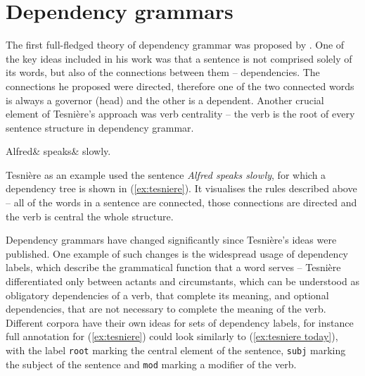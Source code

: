 \section{Dependency grammars}
The first full-fledged theory of dependency grammar was proposed by \cite{tesniere-orig, tesniere}. One of the key ideas included in his work was that a sentence is not comprised solely of its words, but also of the connections between them -- dependencies. The connections he proposed were directed, therefore one of the two connected words is always a governor (head) and the other is a dependent. Another crucial element of Tesnière's approach was verb centrality -- the verb is the root of every sentence structure in dependency grammar. 

\begin{center}
\begin{exe}
	\ex
	\label{ex:tesniere}
    \begin{dependency}[theme = simple, baseline=-\the\dimexpr\fontdimen22\textfont2\relax]
    \begin{deptext}
        Alfred\& speaks\& slowly.\\
    \end{deptext}
    \end{dependency}
\end{exe}
\end{center}

Tesnière as an example used the sentence \textsl{Alfred speaks slowly}, for which a dependency tree is shown in (\ref{ex:tesniere}). It visualises the rules described above -- all of the words in a sentence are connected, those connections are directed and the verb is central the whole structure. 

Dependency grammars have changed significantly since Tesnière's ideas were published. One example of such changes is the widespread usage of dependency labels, which describe the grammatical function that a word serves -- Tesnière differentiated only between actants and circumstants, which can be understood as obligatory dependencies of a verb, that complete its meaning, and optional dependencies, that are not necessary to complete the meaning of the verb. Different corpora have their own ideas for sets of dependency labels, for instance full annotation for (\ref{ex:tesniere}) could look similarly to (\ref{ex:tesniere today}), with the label \texttt{root} marking the central element of the sentence, \texttt{subj} marking the subject of the sentence and \texttt{mod} marking a modifier of the verb.

